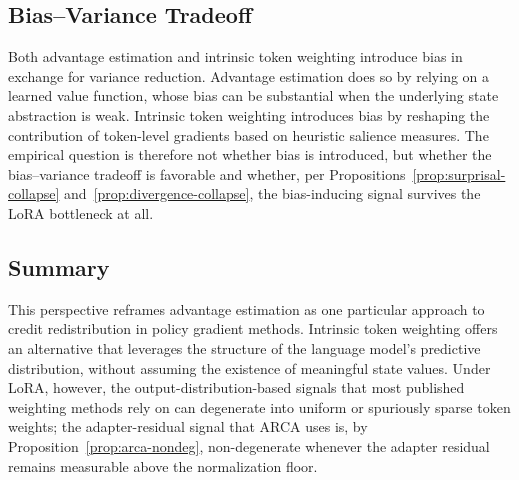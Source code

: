 \subsection{Bias--Variance Tradeoff}

Both advantage estimation and intrinsic token weighting introduce bias in
exchange for variance reduction. Advantage estimation does so by relying on
a learned value function, whose bias can be substantial when the underlying
state abstraction is weak. Intrinsic token weighting introduces bias by
reshaping the contribution of token-level gradients based on heuristic
salience measures. The empirical question is therefore not whether bias is
introduced, but whether the bias--variance tradeoff is favorable and whether,
per Propositions~\ref{prop:surprisal-collapse}
and~\ref{prop:divergence-collapse}, the bias-inducing signal survives the
LoRA bottleneck at all.

\subsection{Summary}

This perspective reframes advantage estimation as one particular approach to
credit redistribution in policy gradient methods. Intrinsic token weighting
offers an alternative that leverages the structure of the language model's
predictive distribution, without assuming the existence of meaningful state
values. Under LoRA, however, the output-distribution-based signals that
most published weighting methods rely on can degenerate into uniform or
spuriously sparse token weights; the adapter-residual signal that ARCA uses
is, by Proposition~\ref{prop:arca-nondeg}, non-degenerate whenever the
adapter residual remains measurable above the normalization floor.
